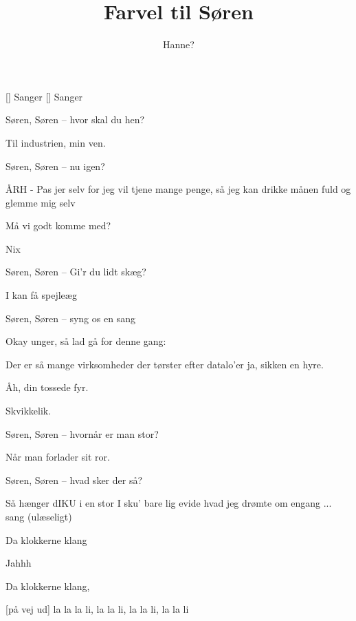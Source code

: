 \documentclass[a4paper,11pt]{article}
\title{Farvel til Søren}
\author{Hanne?}
\begin{document}
\maketitle

\begin{roles}
[] Sanger
[] Sanger
\end{roles}

\begin{song}
 Søren, Søren -- hvor skal du hen?

 Til industrien, min ven.

 Søren, Søren -- nu igen?

 ÅRH - Pas jer selv
for jeg vil tjene mange penge,
så jeg kan drikke månen fuld
og glemme mig selv

 Må vi godt komme med?

 Nix

 Søren, Søren -- Gi'r du lidt skæg?

 I kan få spejleæg

 Søren, Søren -- syng os en sang

 Okay unger, så lad gå for denne gang:

Der er så mange virksomheder
der tørster efter datalo'er
ja, sikken en hyre.

 Åh, din tossede fyr.

 Skvikkelik.

 Søren, Søren -- hvornår er man stor?

 Når man forlader sit ror.

 Søren, Søren -- hvad sker der så?

 Så hænger dIKU i en stor
I sku' bare lig evide
hvad jeg drømte om engang
... sang (ulæseligt)

 Da klokkerne klang

 Jahhh

 Da klokkerne klang,

[på vej ud] la la la li, la la li, la la li, la la li
\end{song}
\end{document}
